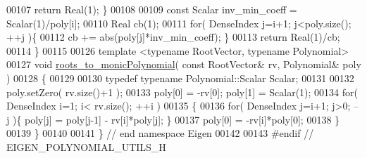 \begin{DoxyCode}
00107     \textcolor{keywordflow}{return} Real(1); \}
00108 
00109   \textcolor{keyword}{const} Scalar inv\_min\_coeff = Scalar(1)/poly[i];
00110   Real cb(1);
00111   \textcolor{keywordflow}{for}( DenseIndex j=i+1; j<poly.size(); ++j )\{
00112     cb += abs(poly[j]*inv\_min\_coeff); \}
00113   \textcolor{keywordflow}{return} Real(1)/cb;
00114 \}
00115 
00126 \textcolor{keyword}{template} <\textcolor{keyword}{typename} RootVector, \textcolor{keyword}{typename} Polynomial>
00127 \textcolor{keywordtype}{void} \hyperlink{namespace_eigen_afbc3648f7ef67db3d5d04454fc1257fd}{roots\_to\_monicPolynomial}( \textcolor{keyword}{const} RootVector& rv, Polynomial& poly )
00128 \{
00129 
00130   \textcolor{keyword}{typedef} \textcolor{keyword}{typename} Polynomial::Scalar Scalar;
00131 
00132   poly.setZero( rv.size()+1 );
00133   poly[0] = -rv[0]; poly[1] = Scalar(1);
00134   \textcolor{keywordflow}{for}( DenseIndex i=1; i< rv.size(); ++i )
00135   \{
00136     \textcolor{keywordflow}{for}( DenseIndex j=i+1; j>0; --j )\{ poly[j] = poly[j-1] - rv[i]*poly[j]; \}
00137     poly[0] = -rv[i]*poly[0];
00138   \}
00139 \}
00140 
00141 \} \textcolor{comment}{// end namespace Eigen}
00142 
00143 \textcolor{preprocessor}{#endif // EIGEN\_POLYNOMIAL\_UTILS\_H}
\end{DoxyCode}
